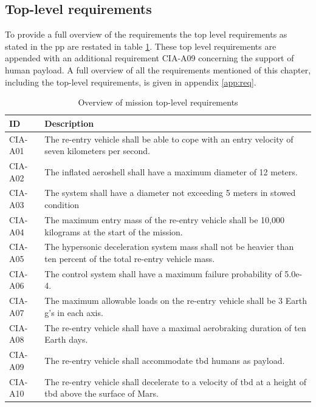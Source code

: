 \subsection{Top-level requirements}
To provide a full overview of the requirements the top level requirements as stated in the \acrfull{pp} are restated in table \ref{tab:toplevelreq}. These top level requirements are appended with an additional requirement CIA-A09 concerning the support of human payload. A full overview of all the requirements mentioned of this chapter, including the top-level requirements, is given in appendix \ref{app:req}.

\begin{table}[H]
	\caption{Overview of mission top-level requirements}
	\begin{tabular}{|p{}|p{}|}
    \hline
    ID          & Description                                                                                                      \\ \hline \hline
    CIA-A01 & The re-entry vehicle shall be able to cope with an entry velocity of seven kilometers per second.                \\ \hline
    CIA-A02 & The inflated aeroshell shall have a maximum diameter of 12 meters.                                               \\ \hline
    CIA-A03 & The system shall have a diameter not exceeding 5 meters in stowed condition                                       \\ \hline
    CIA-A04 & The maximum entry mass of the re-entry vehicle shall be 10,000 kilograms at the start of the mission.				\\ \hline
    CIA-A05 & The hypersonic deceleration system mass shall not be heavier than ten percent of the total re-entry vehicle mass. \\ \hline
    CIA-A06 & The control system shall have a maximum failure probability of 5.0e-4.                                           \\ \hline
    CIA-A07 & The maximum allowable loads on the re-entry vehicle shall be 3 Earth g's in each axis.                            \\ \hline
    CIA-A08 & The re-entry vehicle shall have a maximal aerobraking duration of ten Earth days.                                      \\ \hline
    CIA-A09 & The re-entry vehicle shall accommodate \gls{tbd} humans as payload.                         				            \\ \hline
    CIA-A10 & The re-entry vehicle shall decelerate to a velocity of \gls{tbd} at a height of \gls{tbd} above the surface of Mars. \\ \hline
    \end{tabular}
    \label{tab:toplevelreq}
\end{table}












